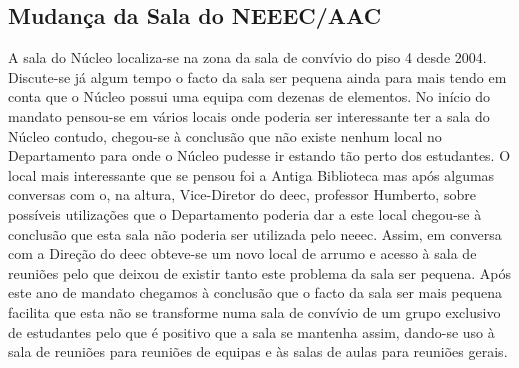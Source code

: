 \subsection{Mudança da Sala do NEEEC/AAC}

A sala do Núcleo localiza-se na zona da sala de convívio do piso 4 desde 2004. Discute-se já algum tempo o facto da sala ser pequena ainda para mais tendo em conta que o Núcleo possui uma equipa com dezenas de elementos. No início do mandato pensou-se em vários locais onde poderia ser interessante ter a sala do Núcleo contudo, chegou-se à conclusão que não existe nenhum local no Departamento para onde o Núcleo pudesse ir estando tão perto dos estudantes. O local mais interessante que se pensou foi a Antiga Biblioteca mas após algumas conversas com o, na altura, Vice-Diretor do \acrshort{deec}, professor Humberto, sobre possíveis utilizações que o Departamento poderia dar a este local chegou-se à conclusão que esta sala não poderia ser utilizada pelo \acrshort{neeec}. Assim, em conversa com a Direção do \acrshort{deec} obteve-se um novo local de arrumo e acesso à sala de reuniões  pelo que deixou de existir tanto este problema da sala ser pequena. Após este ano de mandato chegamos à conclusão que o facto da sala ser mais pequena facilita que esta não se transforme numa sala de convívio de um grupo exclusivo de estudantes pelo que é positivo que a sala se mantenha assim, dando-se uso à sala de reuniões para reuniões de equipas e às salas de aulas para reuniões gerais.